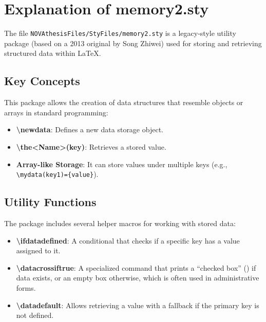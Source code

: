 

\chapter{Explanation of memory2.sty}
\label{annex:memory2}

The file \texttt{NOVAthesisFiles/StyFiles/memory2.sty} is a legacy-style utility package (based on a 2013 original by Song Zhiwei) used for storing and retrieving structured data within \LaTeX{}.

\section{Key Concepts}
This package allows the creation of data structures that resemble objects or arrays in standard programming:
\begin{itemize}
    \item \textbf{\textbackslash newdata}: Defines a new data storage object.
    \item \textbf{\textbackslash the<Name>(key)}: Retrieves a stored value.
    \item \textbf{Array-like Storage}: It can store values under multiple keys (e.g., \texttt{\textbackslash mydata(key1)=\{value\}}).
\end{itemize}

\section{Utility Functions}
The package includes several helper macros for working with stored data:
\begin{itemize}
    \item \textbf{\textbackslash ifdatadefined}: A conditional that checks if a specific key has a value assigned to it.
    \item \textbf{\textbackslash datacrossiftrue}: A specialized command that prints a ``checked box'' (\rlap{$\square$}{\raisebox{2pt}{\hspace{1pt}\tiny$\times$}}) if data exists, or an empty box otherwise, which is often used in administrative forms.
    \item \textbf{\textbackslash datadefault}: Allows retrieving a value with a fallback if the primary key is not defined.
\end{itemize}

